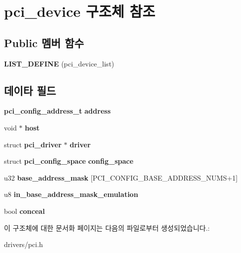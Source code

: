 \section{pci\-\_\-device 구조체 참조}
\label{structpci__device}
\subsection*{Public 멤버 함수}
\begin{DoxyCompactItemize}
\item 
{\bfseries L\-I\-S\-T\-\_\-\-D\-E\-F\-I\-N\-E} (pci\-\_\-device\-\_\-list)\label{structpci__device_a2ad525ef56c564c3245aea33ec81e30d}

\end{DoxyCompactItemize}
\subsection*{데이타 필드}
\begin{DoxyCompactItemize}
\item 
{\bf pci\-\_\-config\-\_\-address\-\_\-t} {\bfseries address}\label{structpci__device_a38e61d43be79357d0cda1a9d035a0110}

\item 
void $\ast$ {\bfseries host}\label{structpci__device_aab00684fa66135ec9687cc6192e28023}

\item 
struct {\bf pci\-\_\-driver} $\ast$ {\bfseries driver}\label{structpci__device_a8c42ea9dafab15170be4786177a45f95}

\item 
struct {\bf pci\-\_\-config\-\_\-space} {\bfseries config\-\_\-space}\label{structpci__device_ae497622b47d64242a8e0a127ea799ac0}

\item 
u32 {\bfseries base\-\_\-address\-\_\-mask} [P\-C\-I\-\_\-\-C\-O\-N\-F\-I\-G\-\_\-\-B\-A\-S\-E\-\_\-\-A\-D\-D\-R\-E\-S\-S\-\_\-\-N\-U\-M\-S+1]\label{structpci__device_a6fdc9d5ca3ac1c7c730a4e9c5f112e4f}

\item 
u8 {\bfseries in\-\_\-base\-\_\-address\-\_\-mask\-\_\-emulation}\label{structpci__device_aa9f7e12f82eaf707395a9d022d43e7d0}

\item 
bool {\bfseries conceal}\label{structpci__device_ad2fe3db784d56b33cef430acd55ec198}

\end{DoxyCompactItemize}


이 구조체에 대한 문서화 페이지는 다음의 파일로부터 생성되었습니다.\-:\begin{DoxyCompactItemize}
\item 
drivers/pci.\-h\end{DoxyCompactItemize}
